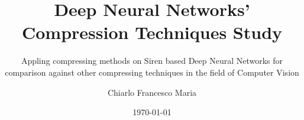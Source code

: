 



\title{Deep Neural Networks' Compression Techniques Study}
\subtitle{Appling compressing methods on Siren based Deep Neural Networks for comparison against other compressing techniques in the field of Computer Vision}
\author{Chiarlo Francesco Maria}
\date{\today}
